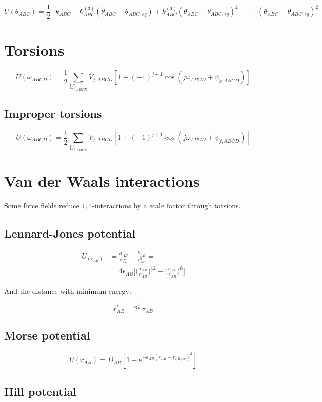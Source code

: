$$U(\theta_{ABC}) = \frac{1}{2}[k_{ABC}+k^{(3)}_{ABC}(\theta_{ABC}-\theta_{ABC,eq})+k^{(4)}_{ABC}(\theta_{ABC}-\theta_{ABC,eq})^2+\cdots](\theta_{ABC}-\theta_{ABC, eq})^2$$

\section{Torsions}

$$U(\omega_{ABCD}) = \frac{1}{2}\sum\limits_{\{j\}_{ABCD}}V_{j,ABCD}[1+(-1)^{j+1}\cos(j\omega_{ABCD}+\psi_{j,ABCD})]$$

	\subsection{Improper torsions}

$$U(\omega_{ABCD}) = \frac{1}{2}\sum\limits_{\{j\}_{ABCD}}V_{j,ABCD}[1+(-1)^{j+1}\cos(j\omega_{ABCD}+\psi_{j,ABCD})]$$

\section{Van der Waals interactions}
Some force fields reduce $1,4$-interactions by a scale factor through torsions.

	\subsection{Lennard-Jones potential}

	\begin{align*}
		U_(r_{AB}) &= \frac{a_{AB}}{r^{12}_{AB}}-\frac{b_{AB}}{r^6_{AB}}=\\
							 &= 4\epsilon_{AB}\biggl[\biggl(\frac{\sigma_{AB}}{r_{AB}}\biggr)^{12}-\biggl(\frac{\sigma_{AB}}{r_{AB}}\biggr)^6\biggr]
	\end{align*}

	And the distance with minimum energy:

	$$r^*_{AB} = 2^{\frac{1}{6}}\sigma_{AB}$$

	\subsection{Morse potential}

	$$U(r_{AB}) = D_{AB}[1-e^{-a_{AB}(r_{AB}-r_{AB,eq})^2}]$$

	\subsection{Hill potential}

